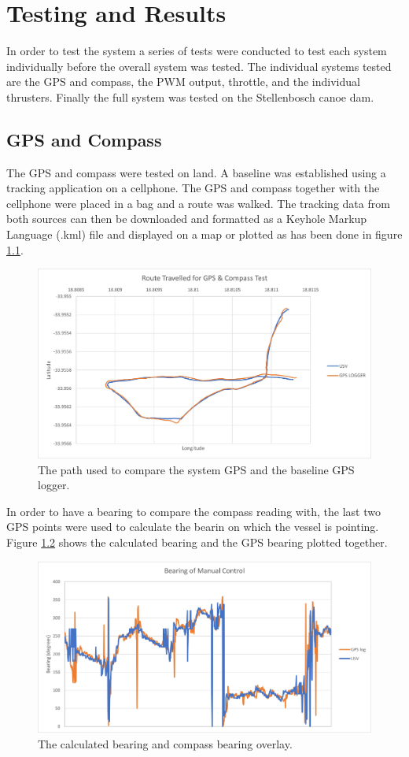 \chapter{Testing and Results}
In order to test the system a series of tests were conducted to test each system individually before the overall system was tested. The individual systems tested are the GPS and compass, the PWM output, throttle, and the individual thrusters. Finally the full system was tested on the Stellenbosch canoe dam. 
\section{GPS and Compass}
The GPS and compass were tested on land. A baseline was established using a tracking application on a cellphone. The GPS and compass together with the cellphone were placed in a bag and a route was walked. The tracking data from both sources can then be downloaded and formatted as a Keyhole Markup Language (.kml) file and displayed on a map or plotted as has been done in figure \ref{fig:4:GPSMap}.\par
\begin{figure}
	\begin{center}
		\includegraphics[width=0.8\linewidth]{figures/graphGPSMap.jpg}
		\caption{The path used to compare the system GPS and the baseline GPS logger.}
		\label{fig:4:GPSMap}
	\end{center}
\end{figure}
In order to have a bearing to compare the compass reading with, the last two GPS points were used to calculate the bearin on which the vessel is pointing. Figure \ref{fig:4:bearingTest} shows the calculated bearing and the GPS bearing plotted together.\par
\begin{figure}
	\begin{center}
		\includegraphics[width=0.8\linewidth]{figures/graphBearingManual.jpg}
		\caption{The calculated bearing and compass bearing overlay.}
		\label{fig:4:bearingTest}
	\end{center}
\end{figure}
